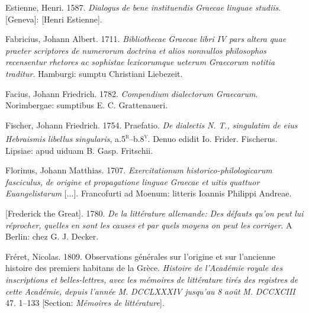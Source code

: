 \documentclass[output=paper]{langsci/langscibook}
\begin{document}
Estienne, Henri. 1587. \textit{Dialogus} \textit{de} \textit{bene} \textit{instituendis} \textit{Graecae} \textit{linguae} \textit{studiis}. [Geneva]: [Henri Estienne].

Fabricius, Johann Albert. 1711. \textit{Bibliothecae} \textit{Graecae} \textit{libri} \textit{IV} \textit{pars} \textit{altera} \textit{quae} \textit{praeter} \textit{scriptores} \textit{de} \textit{numerorum} \textit{doctrina} \textit{et} \textit{alios} \textit{nonnullos} \textit{philosophos} \textit{recensentur} \textit{rhetores} \textit{ac} \textit{sophistae} \textit{lexicorumque} \textit{ueterum} \textit{Graecorum} \textit{notitia} \textit{traditur}. Hamburgi: sumptu Christiani Liebezeit.

Facius, Johann Friedrich. 1782. \textit{Compendium} \textit{dialectorum} \textit{Graecarum}. Norimbergae: sumptibus E. C. Grattenaueri.

Fischer, Johann Friedrich. 1754. Praefatio. \textit{De} \textit{dialectis} \textit{N.} \textit{T.,} \textit{singulatim} \textit{de} \textit{eius} \textit{Hebraismis} \textit{libellus} \textit{singularis}, a.5\textsc{\textsuperscript{r}}–b.8\textsc{\textsuperscript{v}}. Denuo edidit Io. Frider. Fischerus. Lipsiae: apud uiduam B. Gasp. Fritschii.

Florinus, Johann Matthias. 1707. \textit{Exercitationum} \textit{historico-philologicarum} \textit{fasciculus,} \textit{de} \textit{origine} \textit{et} \textit{propagatione} \textit{linguae} \textit{Graecae} \textit{et} \textit{uitis} \textit{quattuor} \textit{Euangelistarum} [...]. Francofurti ad Moenum: litteris Ioannis Philippi Andreae.

[Frederick the Great]. 1780. \textit{De} \textit{la} \textit{littérature} \textit{allemande:} \textit{Des} \textit{défauts} \textit{qu’on} \textit{peut} \textit{lui} \textit{réprocher,} \textit{quelles} \textit{en} \textit{sont} \textit{les} \textit{causes} \textit{et} \textit{par} \textit{quels} \textit{moyens} \textit{on} \textit{peut} \textit{les} \textit{corriger}. A Berlin: chez G. J. Decker.

Fréret, Nicolas. 1809. Observations générales sur l’origine et sur l’ancienne histoire des premiers habitans de la Grèce. \textit{Histoire} \textit{de} \textit{l’Académie} \textit{royale} \textit{des} \textit{inscriptions} \textit{et} \textit{belles-lettres,} \textit{avec} \textit{les} \textit{mémoires} \textit{de} \textit{littérature} \textit{tirés} \textit{des} \textit{registres} \textit{de} \textit{cette} \textit{Académie,} \textit{depuis} \textit{l’année} \textit{M.} \textit{DCCLXXXIV} \textit{jusqu’au} \textit{8} \textit{août} \textit{M.} \textit{DCCXCIII} 47. 1–133 [Section: \textit{Mémoires} \textit{de} \textit{littérature}].
\end{document}

